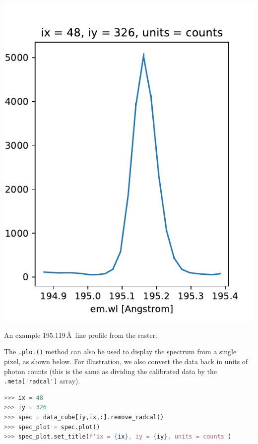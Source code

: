 \begin{marginfigure}
  \centerline{\includegraphics[clip,width=\linewidth]{figures/ex_spectrum.pdf}}
  \caption{An example  195.119\,\AA\ line profile from the raster.}
  \label{fig:spectrum}
\end{marginfigure}

The \verb+.plot()+ method can also be used to display the spectrum from a single pixel, as shown
below. For illustration, we also convert the data back in units of photon counts (this is the same as
dividing the calibrated data by the \verb+.meta['radcal']+ array).

\begin{lstlisting}[language=Python]
>>> ix = 48
>>> iy = 326
>>> spec = data_cube[iy,ix,:].remove_radcal()
>>> spec_plot = spec.plot()
>>> spec_plot.set_title(f'ix = {ix}, iy = {iy}, units = counts')
\end{lstlisting}

